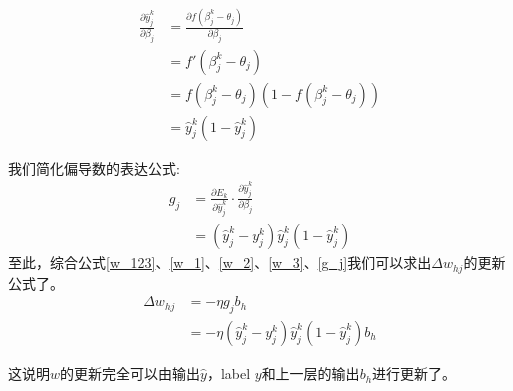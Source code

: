 \documentclass[11pt]{report}
\begin{document}
\begin{equation}
\label{w_2}
	\begin{split}
		\frac{\partial \hat{y}_j^k}{\partial \beta_j}&=\frac{\partial f(\beta_j^k-\theta_j)}{\partial \beta_j}\\
		&=f'(\beta_j^k-\theta_j)\\
		&=f(\beta_j^k-\theta_j)(1-f(\beta_j^k-\theta_j))\\
		&=\hat{y}_j^k(1-\hat{y}_j^k)
	\end{split}
\end{equation}
\par
我们简化偏导数的表达公式:
\begin{equation}
	\label{g_j}
	\begin{split}
		g_j&=\frac{\partial E_k}{\partial \hat{y}_j^k}\cdot\frac{\partial \hat{y}_j^k}{\partial \beta_j}\\
		&=(\hat{y}_j^k-y_j^k)\hat{y}_j^k(1-\hat{y}_j^k)
	\end{split}
\end{equation}
至此，综合公式\ref{w_123}、\ref{w_1}、\ref{w_2}、\ref{w_3}、\ref{g_j}我们可以求出$\Delta w_{hj}$的更新公式了。
\begin{equation}
\label{w_update}
	\begin{split}
		\Delta w_{hj}&=-\eta g_j b_h\\
		&=-\eta(\hat{y}_j^k-y_j^k)\hat{y}_j^k(1-\hat{y}_j^k)b_h
	\end{split}
\end{equation}
\par
这说明$w$的更新完全可以由输出$\hat{y}$，label $y$和上一层的输出$b_h$进行更新了。
\end{document}
